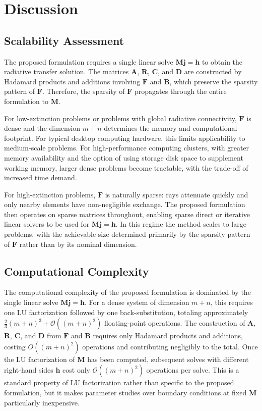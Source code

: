 \documentclass[preprint,1p,times]{elsarticle}
\theoremstyle{plain}
\theoremstyle{definition}
\theoremstyle{remark}
\begin{document}
\section{Discussion}
\label{sec:discussion_overall}

\subsection{Scalability Assessment}
\label{sec:scalability}

The proposed formulation requires a single linear solve $\mathbf{M}\mathbf{j} = \mathbf{h}$ to obtain the radiative transfer solution. The matrices $\mathbf{A}$, $\mathbf{R}$, $\mathbf{C}$, and $\mathbf{D}$ are constructed by Hadamard products and additions involving $\mathbf{F}$ and $\mathbf{B}$, which preserve the sparsity pattern of $\mathbf{F}$. Therefore, the sparsity of $\mathbf{F}$ propagates through the entire formulation to $\mathbf{M}$.

For low-extinction problems or problems with global radiative connectivity, $\mathbf{F}$ is dense and the dimension $m+n$ determines the memory and computational footprint. For typical desktop computing hardware, this limits applicability to medium-scale problems. For high-performance computing clusters, with greater memory availability and the option of using storage disk space to supplement working memory, larger dense problems become tractable, with the trade-off of increased time demand.

For high-extinction problems, $\mathbf{F}$ is naturally sparse: rays attenuate quickly and only nearby elements have non-negligible exchange. The proposed formulation then operates on sparse matrices throughout, enabling sparse direct or iterative linear solvers to be used for $\mathbf{M}\mathbf{j} = \mathbf{h}$. In this regime the method scales to large problems, with the achievable size determined primarily by the sparsity pattern of $\mathbf{F}$ rather than by its nominal dimension.

\subsection{Computational Complexity}

The computational complexity of the proposed formulation is dominated by the single linear solve $\mathbf{M}\mathbf{j} = \mathbf{h}$. For a dense system of dimension $m+n$, this requires one LU factorization followed by one back-substitution, totaling approximately $\frac{2}{3}(m+n)^3 + \mathcal{O}\left((m+n)^2\right)$ floating-point operations. The construction of $\mathbf{A}$, $\mathbf{R}$, $\mathbf{C}$, and $\mathbf{D}$ from $\mathbf{F}$ and $\mathbf{B}$ requires only Hadamard products and additions, costing $O((m+n)^2)$ operations and contributing negligibly to the total. Once the LU factorization of $\mathbf{M}$ has been computed, subsequent solves with different right-hand sides $\mathbf{h}$ cost only $\mathcal{O}\left((m+n)^2\right)$ operations per solve. This is a standard property of LU factorization rather than specific to the proposed formulation, but it makes parameter studies over boundary conditions at fixed $\mathbf{M}$ particularly inexpensive.
\end{document}
